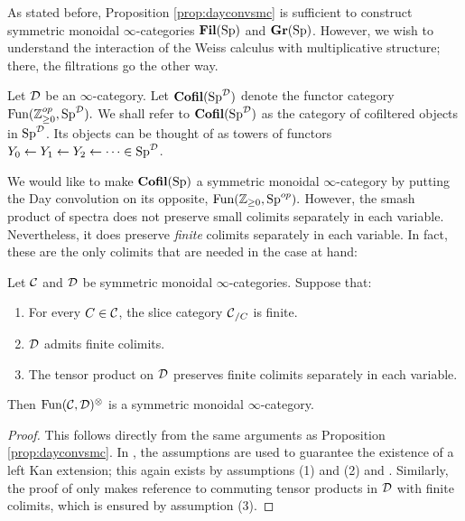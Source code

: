 As stated before, Proposition \ref{prop:dayconvsmc} is sufficient to construct symmetric monoidal $\infty$-categories $\operatorname{\textbf{Fil}}(\operatorname{\text{Sp}})$ and $\operatorname{\textbf{Gr}}(\operatorname{\text{Sp}})$.  However, we wish to understand the interaction of the Weiss calculus with multiplicative structure; there, the filtrations go the other way.

\begin{dfn}Let $\operatorname{\mathcal{D}}$ be an $\infty$-category.  Let $\operatorname{\textbf{Cofil}}(\operatorname{\text{Sp}}^{\operatorname{\mathcal{D}}})$ denote the functor category $\operatorname{\text{Fun}}(\operatorname{\mathbb{Z}}_{\geq 0}^{op}, \operatorname{\text{Sp}}^{\operatorname{\mathcal{D}}}).$  We shall refer to $\operatorname{\textbf{Cofil}}(\operatorname{\text{Sp}}^{\operatorname{\mathcal{D}}})$ as the category of cofiltered objects in $\operatorname{\text{Sp}}^{\operatorname{\mathcal{D}}}$.  Its objects can be thought of as towers of functors $Y_0\leftarrow Y_1\leftarrow Y_2 \leftarrow \cdots \in \operatorname{\text{Sp}}^{\operatorname{\mathcal{D}}}$.
\end{dfn}

We would like to make $\operatorname{\textbf{Cofil}}(\operatorname{\text{Sp}})$ a symmetric monoidal $\infty$-category by putting the Day convolution on its opposite, $\operatorname{\text{Fun}}(\operatorname{\mathbb{Z}}_{\geq 0}, \operatorname{\text{Sp}}^{op}).$  However, the smash product of spectra does not preserve small colimits separately in each variable.  Nevertheless, it does preserve \emph{finite} colimits separately in each variable.  In fact, these are the only colimits that are needed in the case at hand:

\begin{var}
Let $\operatorname{\mathcal{C}}$ and $\operatorname{\mathcal{D}}$ be symmetric monoidal $\infty$-categories.  Suppose that:
\begin{enumerate}
\item For every $C\in \operatorname{\mathcal{C}}$, the slice category $\operatorname{\mathcal{C}}_{/C}$ is finite.  
\item $\operatorname{\mathcal{D}}$ admits finite colimits. 
\item The tensor product on $\operatorname{\mathcal{D}}$ preserves finite colimits separately in each variable.  
\end{enumerate}
Then $\operatorname{\text{Fun}}(\operatorname{\mathcal{C}}, \operatorname{\mathcal{D}})^{\otimes}$ is a symmetric monoidal $\infty$-category.  
\end{var}
\begin{proof}
This follows directly from the same arguments as Proposition \ref{prop:dayconvsmc}.  In \cite[Corollary 2.2.6.14]{HA}, the assumptions are used to guarantee the existence of a left Kan extension; this again exists by assumptions (1) and (2) and \cite[Lemma 4.3.2.13]{HTT}.  Similarly, the proof of \cite[Proposition 2.2.6.16]{HA} only makes reference to commuting tensor products in $\operatorname{\mathcal{D}}$ with finite colimits, which is ensured by assumption (3).  
\end{proof}










